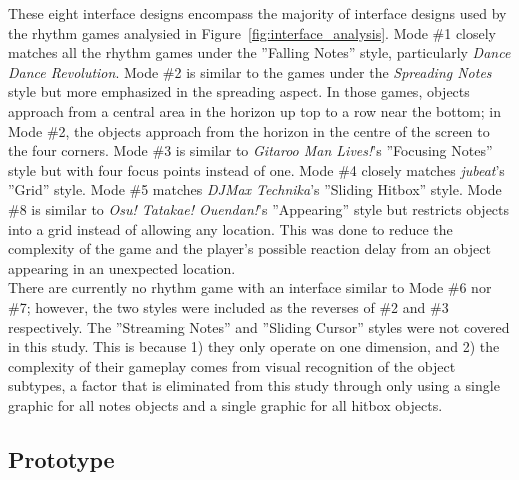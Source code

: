 \documentclass{sig-alternate}
\begin{document}
These eight interface designs encompass the majority of interface designs used by the rhythm games analysied in Figure~\ref{fig:interface_analysis}. Mode \#1 closely matches all the rhythm games under the ''Falling Notes'' style, particularly \textit{Dance Dance Revolution}. Mode \#2 is similar to the games under the \textit{Spreading Notes} style but more emphasized in the spreading aspect. In those games, objects approach from a central area in the horizon up top to a row near the bottom; in Mode \#2, the objects approach from the horizon in the centre of the screen to the four corners. Mode \#3 is similar to \textit{Gitaroo Man Lives!}'s ''Focusing Notes'' style but with four focus points instead of one. Mode \#4 closely matches \textit{jubeat}'s ''Grid'' style. Mode \#5 matches \textit{DJMax Technika}'s ''Sliding Hitbox'' style. Mode \#8 is similar to \textit{Osu! Tatakae! Ouendan!}'s ''Appearing'' style but restricts objects into a grid instead of allowing any location. This was done to reduce the complexity of the game and the player's possible reaction delay from an object appearing in an unexpected location.\\

There are currently no rhythm game with an interface similar to Mode \#6 nor \#7; however, the two styles were included as the reverses of \#2 and \#3 respectively. The ''Streaming Notes'' and ''Sliding Cursor'' styles were not covered in this study. This is because 1) they only operate on one dimension, and 2) the complexity of their gameplay comes from visual recognition of the object subtypes, a factor that is eliminated from this study through only using a single graphic for all notes objects and a single graphic for all hitbox objects.\\

\subsection{Prototype}
\label{subsec:study_overview}
\end{document}
